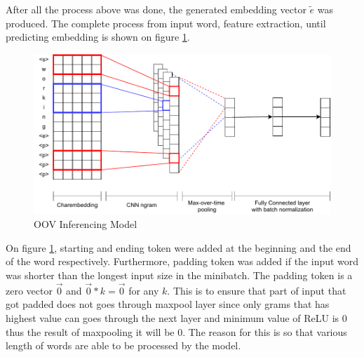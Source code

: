         After all the process above was done, the generated embedding
        vector $\tilde{e}$ was produced.
        The complete process from input word, feature extraction,
        until predicting embedding is shown on figure \ref{fig:model}.
        \begin{figure}
            \centering
            \includegraphics[width=.8\linewidth]{images/model_batchnorm.pdf}
            \caption{OOV Inferencing Model}
            \label{fig:model}
        \end{figure}
        On figure \ref{fig:model}, starting and ending token were
        added at the beginning and the end of the word respectively.
        Furthermore, padding token was added if the input word was
        shorter than the longest input size in the minibatch. The
        padding token is a zero vector $\vec{0}$ and $\vec{0} * k =
        \vec{0}$ for any $k$. This is to ensure that part of input
        that got padded does not goes through maxpool layer since only
        grams that has highest value can goes through the next layer
        and minimum value of ReLU is 0 thus the result of maxpooling
        it will be 0. The reason for this is so that various length of
        words are able to be processed by the model.

